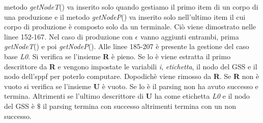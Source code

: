 metodo \textit{getNodeT}() va inserito solo quando gestiamo il primo item di un corpo di una produzione e il metodo \textit{getNodeP}() va inserito solo nell'ultimo item il cui corpo di produzione è composto solo da un terminale. Ciò viene dimostrato nelle linee 152-167. Nel caso di produzione con $\epsilon$ vanno aggiunti entrambi, prima \textit{getNodeT}() e poi \textit{getNodeP}(). Alle linee 185-207 è presente la gestione del caso base \textit{L0}. Si verifica se l'insieme \textbf{R} è pieno. Se lo è viene estratta il primo descrittore da \textbf{R} e vengono impostate le variabili \textit{i}, \textit{etichetta}, il nodo del GSS e il nodo dell'sppf per poterlo computare. Dopodichè viene rimosso da \textbf{R}. Se \textbf{R} non è vuoto si verifica se l'insieme \textbf{U} è vuoto. Se lo è il parsing non ha avuto successo e termina. Altrimenti se l'ultimo descrittore di \textbf{U} ha come etichetta \textit{L0} e il nodo del GSS è $\$$ il parsing termina con successo altrimenti termina con un non successo.